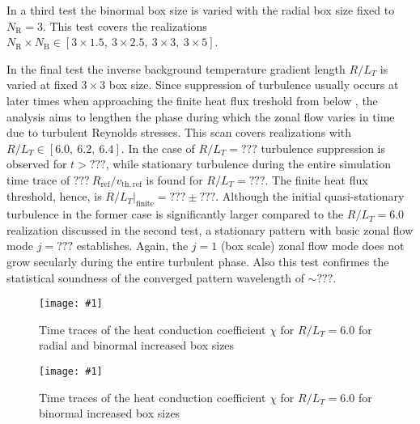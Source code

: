 \documentclass[aip, amsmath, amssymb, reprint, twocolumn]{revtex4-1}
\newcommand{\includegraphicsOneCol}[3]{
	\begin{figure}[ht]
		\texttt{[image: \#1]}
		\caption{#2}
		\label{#3}
  	\end{figure}
  	\increasecounter{fig}{1}
}
\newcommand{\NR}{N_\mathrm{R}}
\newcommand{\NB}{N_\mathrm{B}}
\newcommand{\vthref}{v_\mathrm{th,ref}}
\newcommand{\Rref}{R_\mathrm{ref}}
\newcommand{\rlt}{R/L_T}
\begin{document}
In a third test the binormal box size is varied with the radial box size fixed to $\NR = 3$.
This test covers the realizations $\NR \times \NB \in [3\times1.5,~3\times2.5,~3\times3,~3\times5]$.
\bigskip

In the final test the inverse background temperature gradient length $\rlt$ is varied at fixed $3\times3$ box size.
Since suppression of turbulence usually occurs at later times when approaching the finite heat flux treshold from below \cite{peeters2016}, the analysis aims to lengthen the phase during which the zonal flow varies in time due to turbulent Reynolds stresses.
This scan covers realizations with $\rlt \in [6.0,~6.2,~6.4]$.
In the case of $\rlt = ???$ turbulence suppression is observed for $t > ???$, while stationary turbulence during the entire simulation time trace of $???~\Rref/\vthref$ is found for $\rlt = ???$.
The finite heat flux threshold, hence, is $\rlt|_\mathrm{finite} = ??? \pm ???$.
Although the initial quasi-stationary turbulence in the former case is significantly larger compared to the $\rlt = 6.0$ realization discussed in the second test, a stationary pattern with basic zonal flow mode $j = ???$ establishes. 
Again, the $j = 1$ (box scale) zonal flow mode does not grow secularly during the entire turbulent phase.
Also this test confirmes the statistical soundness of the converged pattern wavelength of $\sim ???$.

\includegraphicsOneCol{{Comparison/Boxsize/S6_rlt6.0_boxsize1x1-2x2-3x3_Ns16_Nvpar48_Nmu9_eflux_comparison}.pdf}{
	Time traces of the heat conduction coefficient $\chi$ for $R/L_T = 6.0$ for radial and binormal increased box sizes
}{fig:eflux-1x1-2x2-3x3-comparison}

\includegraphicsOneCol{{Comparison/Boxsize/S6_rlt6.0_boxsize3x1-1.5-2.5-3-5_Ns16_Nvpar48_Nmu9_eflux_comparison}.pdf}{
	Time traces of the heat conduction coefficient $\chi$ for $R/L_T = 6.0$ for binormal increased box sizes
}{fig:eflux-1x1-2x2-3x3-comparison}



\end{document}
